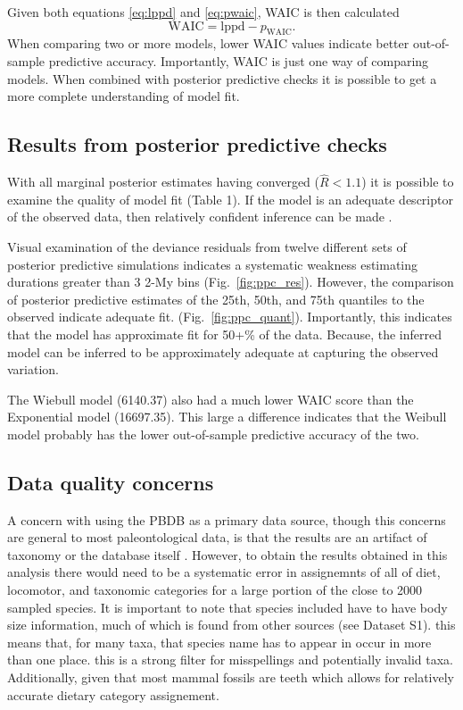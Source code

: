 Given both equations \ref{eq:lppd} and \ref{eq:pwaic}, WAIC is then calculated
\begin{equation}
  \mathrm{WAIC} = \mathrm{lppd} - p_{\mathrm{WAIC}}.
  \label{eq:waic}
\end{equation}
When comparing two or more models, lower WAIC values indicate better out-of-sample predictive accuracy. Importantly, WAIC is just one way of comparing models. When combined with posterior predictive checks it is possible to get a more complete understanding of model fit.

\subsection{Results from posterior predictive checks}
With all marginal posterior estimates having converged (\(\hat{R} < 1.1\)) it is possible to examine the quality of model fit (Table 1). If the model is an adequate descriptor of the observed data, then relatively confident inference can be made \cite{Gelman2013d}.

Visual examination of the deviance residuals from twelve different sets of posterior predictive simulations indicates a systematic weakness estimating durations greater than 3 2-My bins (Fig.~\ref{fig:ppc_res}). However, the comparison of posterior predictive estimates of the 25th, 50th, and 75th quantiles to the observed indicate adequate fit. (Fig.~\ref{fig:ppc_quant}). Importantly, this indicates that the model has approximate fit for 50+\% of the data. Because, the inferred model can be inferred to be approximately adequate at capturing the observed variation.

The Wiebull model (6140.37) also had a much lower WAIC score than the Exponential model (16697.35). This large a difference indicates that the Weibull model probably has the lower out-of-sample predictive accuracy of the two.

\subsection{Data quality concerns}
A concern with using the PBDB as a primary data source, though this concerns are general to most paleontological data, is that the results are an artifact of taxonomy or the database itself \cite{Wagner2007}. However, to obtain the results obtained in this analysis there would need to be a systematic error in assignemnts of all of diet, locomotor, and taxonomic categories for a large portion of the close to 2000 sampled species. It is important to note that species included have to have body size information, much of which is found from other sources (see Dataset S1). this means that, for many taxa, that species name has to appear in occur in more than one place. this is a strong filter for misspellings and potentially invalid taxa. Additionally, given that most mammal fossils are teeth which allows for relatively accurate dietary category assignement. 

